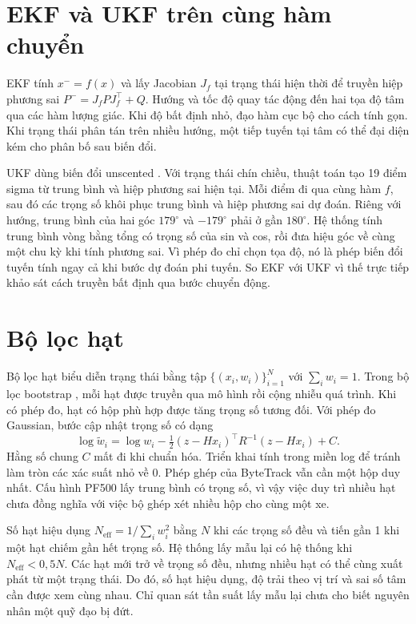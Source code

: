 \section{EKF và UKF trên cùng hàm chuyển}
EKF tính $x^-=f(x)$ và lấy Jacobian $J_f$ tại trạng thái hiện thời để truyền hiệp phương sai $P^-=J_fPJ_f^\top+Q$. Hướng và tốc độ quay tác động đến hai tọa độ tâm qua các hàm lượng giác. Khi độ bất định nhỏ, đạo hàm cục bộ cho cách tính gọn. Khi trạng thái phân tán trên nhiều hướng, một tiếp tuyến tại tâm có thể đại diện kém cho phân bố sau biến đổi.

UKF dùng biến đổi unscented \cite{julier}. Với trạng thái chín chiều, thuật toán tạo 19 điểm sigma từ trung bình và hiệp phương sai hiện tại. Mỗi điểm đi qua cùng hàm $f$, sau đó các trọng số khôi phục trung bình và hiệp phương sai dự đoán. Riêng với hướng, trung bình của hai góc $179^\circ$ và $-179^\circ$ phải ở gần $180^\circ$. Hệ thống tính trung bình vòng bằng tổng có trọng số của sin và cos, rồi đưa hiệu góc về cùng một chu kỳ khi tính phương sai. Vì phép đo chỉ chọn tọa độ, nó là phép biến đổi tuyến tính ngay cả khi bước dự đoán phi tuyến. So EKF với UKF vì thế trực tiếp khảo sát cách truyền bất định qua bước chuyển động.

\section{Bộ lọc hạt}
Bộ lọc hạt biểu diễn trạng thái bằng tập $\{(x_i,w_i)\}_{i=1}^{N}$ với $\sum_i w_i=1$. Trong bộ lọc bootstrap \cite{gordon}, mỗi hạt được truyền qua mô hình rồi cộng nhiễu quá trình. Khi có phép đo, hạt có hộp phù hợp được tăng trọng số tương đối. Với phép đo Gaussian, bước cập nhật trọng số có dạng
\[
 \log\widetilde w_i=\log w_i-\tfrac12(z-Hx_i)^\top R^{-1}(z-Hx_i)+C.
\]
Hằng số chung $C$ mất đi khi chuẩn hóa. Triển khai tính trong miền log để tránh làm tròn các xác suất nhỏ về 0. Phép ghép của ByteTrack vẫn cần một hộp duy nhất. Cấu hình PF500 lấy trung bình có trọng số, vì vậy việc duy trì nhiều hạt chưa đồng nghĩa với việc bộ ghép xét nhiều hộp cho cùng một xe.

Số hạt hiệu dụng $N_{\mathrm{eff}}=1/\sum_i w_i^2$ bằng $N$ khi các trọng số đều và tiến gần 1 khi một hạt chiếm gần hết trọng số. Hệ thống lấy mẫu lại có hệ thống khi $N_{\mathrm{eff}}<0{,}5N$. Các hạt mới trở về trọng số đều, nhưng nhiều hạt có thể cùng xuất phát từ một trạng thái. Do đó, số hạt hiệu dụng, độ trải theo vị trí và sai số tâm cần được xem cùng nhau. Chỉ quan sát tần suất lấy mẫu lại chưa cho biết nguyên nhân một quỹ đạo bị đứt.

